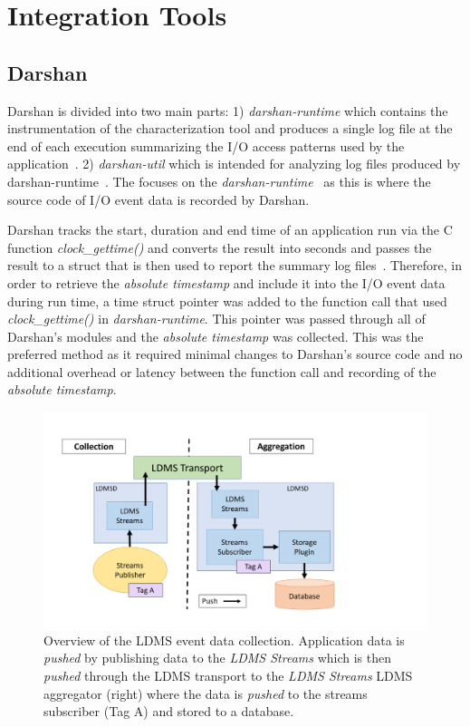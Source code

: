 \section{Integration Tools}
\label{sec:integration}
\subsection{Darshan}
Darshan is divided into two main parts: 1) \emph{darshan-runtime} which contains the instrumentation of the characterization tool and produces a single log file at the end of each execution summarizing the I/O access patterns used by the application~\cite{darshan-doc}. 2) \emph{darshan-util} which is intended for analyzing log files produced by darshan-runtime~\cite{darshan-doc}. The \Darshan{} focuses on the \emph{darshan-runtime}~\cite{darshan-runtime} as this is where the source code of I/O event data is recorded by Darshan.

Darshan tracks the start, duration and end time of an application run via the C function \emph{clock\_gettime()} and converts the result into seconds and passes the result to a struct that is then used to report the summary log files~\cite{darshangithub}. Therefore, in order to retrieve the \emph{absolute timestamp} and include it into the I/O event data during run time, a time struct pointer was added to the function call that used \emph{clock\_gettime()} in \emph{darshan-runtime}. This pointer was passed through all of Darshan's modules and the \emph{absolute timestamp} was collected. This was the preferred method as it required minimal changes to Darshan's source code and no additional overhead or latency between the function call and recording of the \emph{absolute timestamp}. 

\begin{figure}
	\centering
	\includegraphics[trim=0 1cm 1 1.5cm ,clip,width=1.2\linewidth]{figs/ldms-overview.pdf}
	\caption{Overview of the LDMS event data collection. Application data is \emph{pushed} by publishing data to the \emph{LDMS Streams} which is then \emph{pushed} through the LDMS transport to the \emph{LDMS Streams} LDMS aggregator (right) where the data is \emph{pushed} to the streams subscriber (Tag A) and stored to a database.}
	\label{f:LDMS Overview}
\end{figure}


